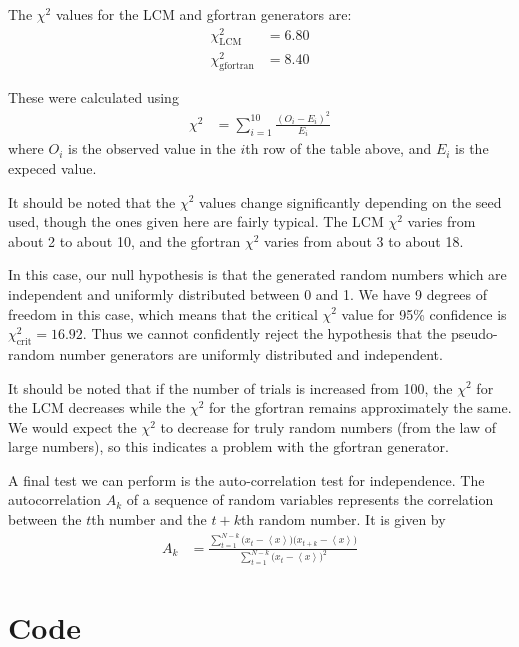\documentclass[twocolumn]{myarticle}
\begin{document}
The $ \chi^2 $ values for the LCM and gfortran generators are:
\begin{align}
    \chi_{\text{LCM}}^2 &= 6.80
    \\
    \chi_{\text{gfortran}}^2 &= 8.40
\end{align}

These were calculated using 
\begin{align}
    \chi^2 &= \sum_{i=1}^{10} \frac{(O_i - E_i)^2}{E_i}
\end{align}
where $ O_i $ is the observed value in the $ i $th row of the table above, and $ E_i $ is the expeced value. 

It should be noted that the $ \chi^2 $ values change significantly depending on the seed used, though the ones given here are fairly typical.
The LCM $ \chi^2 $ varies from about 2 to about 10, and the gfortran $ \chi^2 $ varies from about 3 to about 18.

In this case, our null hypothesis is that the generated random numbers which are independent and uniformly distributed between 0 and 1.
We have 9 degrees of freedom in this case, which means that the critical $ \chi^2 $ value for 95\% confidence is $ \chi_{\text{crit}}^2 = 16.92 $.
Thus we cannot confidently reject the hypothesis that the pseudo-random number generators are uniformly distributed and independent.

It should be noted that if the number of trials is increased from 100, the $ \chi^2 $ for the LCM decreases while the $ \chi^2 $ for the gfortran remains approximately the same.
We would expect the $ \chi^2 $ to decrease for truly random numbers (from the law of large numbers), so this indicates a problem with the gfortran generator.

A final test we can perform is the auto-correlation test for independence.
The autocorrelation $ A_k $ of a sequence of random variables represents the correlation between the $ t $th number and the $ t+k $th random number.
It is given by
\begin{align}
    A_k &= \frac{\displaystyle \sum_{t=1}^{N-k}\big(x_t - \left\langle x \right\rangle\big)\big( x_{t+k} - \left\langle x \right\rangle \big)}{\displaystyle \sum_{t=1}^{N-k} \big( x_t - \left\langle x \right\rangle \big)^2}
\end{align}


\onecolumn

\section{Code}
\label{sec:code}
\end{document}
